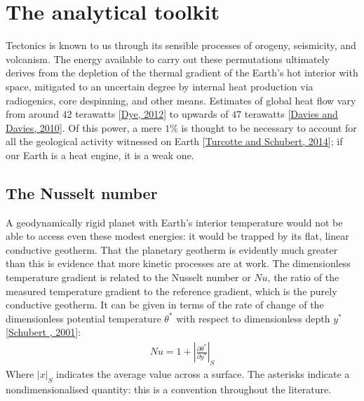 \documentclass[letterpaper,10pt,english]{jupyterBook}
\begin{document}
\section{The analytical toolkit}
\label{\detokenize{content/chapter_02_methods/section1:the-analytical-toolkit}}\label{\detokenize{content/chapter_02_methods/section1::doc}}
\sphinxAtStartPar
Tectonics is known to us through its sensible processes of orogeny, seismicity, and volcanism. The energy available to carry out these permutations ultimately derives from the depletion of the thermal gradient of the Earth’s hot interior with space, mitigated to an uncertain degree by internal heat production via radiogenics, core despinning, and other means. Estimates of global heat flow vary from around \(42\) terawatts {[}\hyperlink{cite.references:id660}{Dye, 2012}{]} to upwards of \(47\) terawatts {[}\hyperlink{cite.references:id646}{Davies and Davies, 2010}{]}. Of this power, a mere \(1\%\) is thought to be necessary to account for all the geological activity witnessed on Earth {[}\hyperlink{cite.references:id664}{Turcotte and Schubert, 2014}{]}; if our Earth is a heat engine, it is a weak one.


\subsection{The Nusselt number}
\label{\detokenize{content/chapter_02_methods/section1:the-nusselt-number}}
\sphinxAtStartPar
A geodynamically rigid planet with Earth’s interior temperature would not be able to access even these modest energies: it would be trapped by its flat, linear conductive geotherm. That the planetary geotherm is evidently much greater than this is evidence that more kinetic processes are at work. The dimensionless temperature gradient is related to the Nusselt number or \(Nu\), the ratio of the measured temperature gradient to the reference gradient, which is the purely conductive geotherm. It can be given in terms of the rate of change of the dimensionless potential temperature \(\theta^*\) with respect to dimensionless depth \(y^*\) {[}\hyperlink{cite.references:id663}{Schubert , 2001}{]}:
\begin{equation*}
\begin{split} Nu = 1 + \left| \frac{\partial \theta^*}{\partial y^*} \right| _S \end{split}
\end{equation*}
\sphinxAtStartPar
Where \(|x|_S\) indicates the average value across a surface. The asterisks indicate a non\sphinxhyphen{}dimensionalised quantity: this is a convention throughout the literature.
\end{document}
